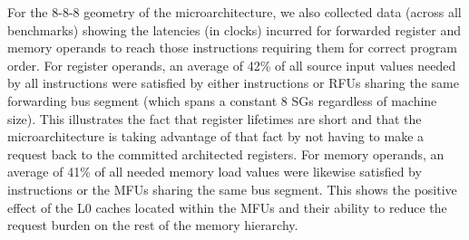 \documentclass[10pt,twocolumn]{article}
\begin{document}
For the 8-8-8 geometry of the microarchitecture, we also collected
data (across all benchmarks) showing the latencies (in clocks) incurred
for forwarded register and memory operands to reach those instructions
requiring them for correct program order.  For register operands,
an average of
42\% of all source input values needed by all instructions
were satisfied by either instructions or RFUs sharing the same forwarding
bus segment (which spans a constant 8 SGs regardless of machine
size).  This illustrates the fact that register lifetimes are
short and that the microarchitecture is taking advantage of
that fact by not having to make a request back to the committed
architected registers.
For memory operands, 
an average of
41\% of all needed memory load values
were likewise satisfied by instructions or the MFUs sharing
the same bus segment.  This shows the positive effect of the
L0 caches located within the MFUs and their ability to
reduce the request burden on the rest of the memory hierarchy.
\end{document}
